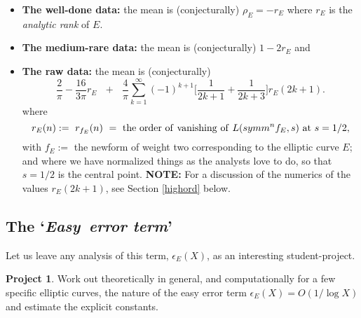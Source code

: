 \documentclass[11pt]{article}
\theoremstyle{plain}
\theoremstyle{definition}
\newtheorem{project}[theorem]{Project}
\numberwithin{equation}{section}
\numberwithin{figure}{section}
\numberwithin{table}{section}
\begin{document}
    \begin{itemize}
   \item {\bf The well-done data:} the  mean is (conjecturally) $\rho_E= -r_E$ where $r_E$ is the {\it analytic rank} of $E$.
    \item {\bf The medium-rare data:} the  mean is  (conjecturally)  $1-2r_E$ and
      \item {\bf The raw data:} the  mean is  (conjecturally) \begin{equation*}
{\frac{2}{\pi}}- {\frac{16}{3\pi}}r_E \ \ \ + \ \ \  {\frac{4}{\pi}} \sum_{k=1}^{\infty}  (-1)^{k+1}\big[{\frac{1}{2k+1}} + {\frac{1}{2k+3}}\big]r_E({2k+1}).
\end{equation*} where $$r_E(n):= \ r_{f_E}(n)\ = \ {\rm the\ order\ of\ vanishing\ of\ }L(symm^nf_E, s)\ {\rm at}\ s=1/2,$$ with $f_E:=$ the newform of weight two corresponding to the elliptic curve $E$; and where we have normalized things as the analysts love to do, so that $s=1/2$ is the central point. {\bf NOTE:} For a discussion of the numerics of the values $r_E({2k+1})$, see Section {\ref{highord}} below.
   \end{itemize}
  \subsection{The  `{\it Easy\ error term}'}

   Let us leave any analysis of this term, $\epsilon_E(X)$, as an interesting  student-project.
 \begin{project} Work out theoretically in general, and computationally for a few specific elliptic  curves, the nature of the easy error term  $\epsilon_E(X)  = O(1/\log X)$ and estimate the explicit constants.\end{project}

\end{document}
